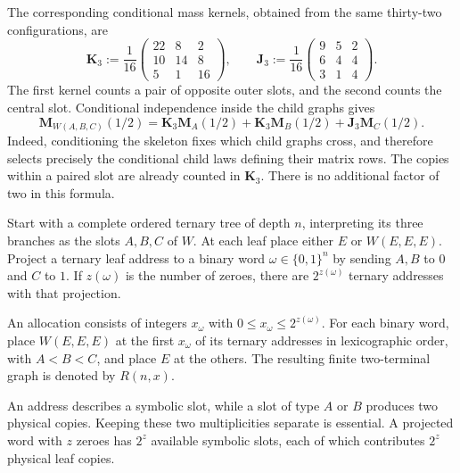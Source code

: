 The corresponding conditional mass kernels, obtained from the same thirty-two configurations, are
\begin{equation}\label{eq:wheatstone-kernels}
 \mathbf K_3:=\frac1{16}
 \begin{pmatrix}22&8&2\\10&14&8\\5&1&16\end{pmatrix},
 \qquad
 \mathbf J_3:=\frac1{16}
 \begin{pmatrix}9&5&2\\6&4&4\\3&1&4\end{pmatrix}.
\end{equation}
The first kernel counts a pair of opposite outer slots, and the second counts the central slot. Conditional independence inside the child graphs gives
\begin{equation}\label{eq:wheatstone-mass}
 \mathbf M_{W(A,B,C)}(1/2)
 =\mathbf K_3\mathbf M_A(1/2)
  +\mathbf K_3\mathbf M_B(1/2)
  +\mathbf J_3\mathbf M_C(1/2).
\end{equation}
Indeed, conditioning the skeleton fixes which child graphs cross, and therefore selects precisely the conditional child laws defining their matrix rows. The copies within a paired slot are already counted in $\mathbf K_3$. There is no additional factor of two in this formula.

\begin{definition}\label{def:leaf-allocation}
Start with a complete ordered ternary tree of depth $n$, interpreting its three branches as the slots $A,B,C$ of $W$. At each leaf place either $E$ or $W(E,E,E)$. Project a ternary leaf address to a binary word $\omega\in\{0,1\}^n$ by sending $A,B$ to $0$ and $C$ to $1$. If $z(\omega)$ is the number of zeroes, there are $2^{z(\omega)}$ ternary addresses with that projection.

An allocation consists of integers $x_\omega$ with $0\le x_\omega\le2^{z(\omega)}$. For each binary word, place $W(E,E,E)$ at the first $x_\omega$ of its ternary addresses in lexicographic order, with $A<B<C$, and place $E$ at the others. The resulting finite two-terminal graph is denoted by $R(n,x)$.
\end{definition}

An address describes a symbolic slot, while a slot of type $A$ or $B$ produces two physical copies. Keeping these two multiplicities separate is essential. A projected word with $z$ zeroes has $2^z$ available symbolic slots, each of which contributes $2^z$ physical leaf copies.

